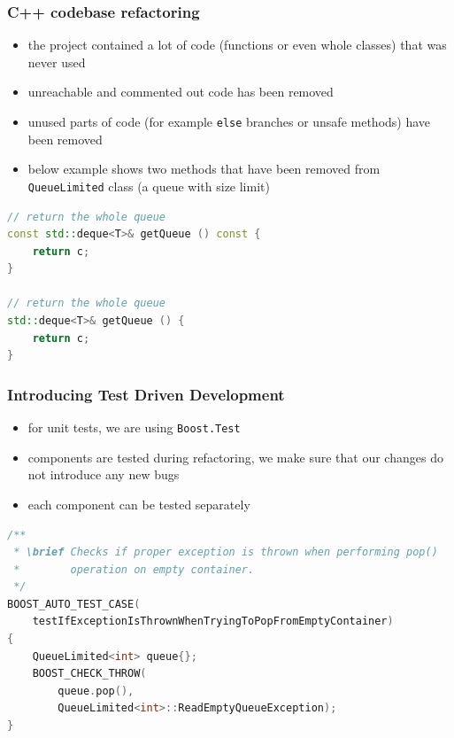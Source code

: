 \documentclass[10pt]{beamer}
\begin{document}
\begin{frame}[fragile]
\frametitle{C++ codebase refactoring}
\begin{itemize}
    \item the project contained a lot of code (functions or even whole classes) that was never used
    \item unreachable and commented out code has been removed
    \item unused parts of code (for example \lstinline[basicstyle=\ttfamily\normalsize]{else} branches or unsafe methods) have been removed
    \item below example shows two methods that have been removed from \lstinline[basicstyle=\ttfamily\normalsize]{QueueLimited} class (a queue with size limit)
\end{itemize}
\begin{lstlisting}[language=c++, caption={Example of removed code.}]
// return the whole queue
const std::deque<T>& getQueue () const {
    return c;
}

// return the whole queue
std::deque<T>& getQueue () {
    return c;
}
\end{lstlisting}
\end{frame}


\begin{frame}[fragile]
\frametitle{Introducing Test Driven Development}
\begin{itemize}
\item for unit tests, we are using \lstinline[basicstyle=\ttfamily\normalsize]{Boost.Test}
\item components are tested during refactoring, we make sure that our changes do not introduce any new bugs
\item each component can be tested separately
\end{itemize}
\begin{lstlisting}[language=c++, caption={Unit test example}]
/**
 * \brief Checks if proper exception is thrown when performing pop() 
 *        operation on empty container.
 */
BOOST_AUTO_TEST_CASE(
    testIfExceptionIsThrownWhenTryingToPopFromEmptyContainer)
{
    QueueLimited<int> queue{};
    BOOST_CHECK_THROW(
        queue.pop(), 
        QueueLimited<int>::ReadEmptyQueueException);
}   
\end{lstlisting}
\end{frame}
\end{document}

